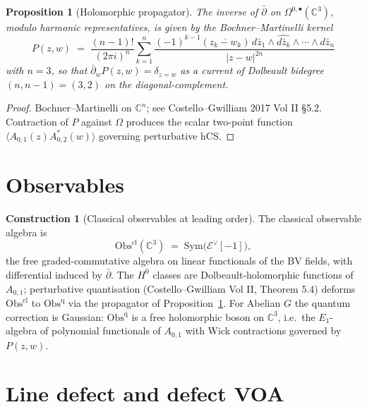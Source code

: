\documentclass[11pt]{amsart}
\providecommand{\C}{\mathbb{C}}
\providecommand{\dbar}{\bar{\partial}}
\providecommand{\Obs}{\mathrm{Obs}}
\providecommand{\Sym}{\mathrm{Sym}}
\theoremstyle{plain}
\newtheorem{proposition}[theorem]{Proposition}
\theoremstyle{definition}
\newtheorem{construction}[theorem]{Construction}
\theoremstyle{remark}
\begin{document}
\begin{proposition}[Holomorphic propagator]
\label{prop:propagator}
The inverse of $\dbar$ on $\Omega^{0,\bullet}(\C^3)$, modulo harmonic
representatives, is given by the Bochner--Martinelli kernel
\[
P(z, w) \;=\; \frac{(n-1)!}{(2\pi i)^{n}}
\sum_{k=1}^{n}
\frac{(-1)^{k-1} (\overline{z_k - w_k})\,
d\bar{z}_1 \wedge \widehat{d\bar{z}_k} \wedge \cdots \wedge d\bar{z}_n}
{|z - w|^{2n}}
\]
with $n = 3$, so that $\dbar_w P(z, w) = \delta_{z=w}$ as a current of
Dolbeault bidegree $(n, n-1) = (3, 2)$ on the diagonal-complement.
\end{proposition}

\begin{proof}
Bochner--Martinelli on $\C^n$; see Costello--Gwilliam 2017 Vol II §5.2.
Contraction of $P$ against $\Omega$ produces the scalar two-point function
$\langle A_{0,1}(z) A^{\ast}_{0,2}(w) \rangle$ governing perturbative
hCS.
\end{proof}

\section{Observables}

\begin{construction}[Classical observables at leading order]
\label{cons:obs-classical}
The classical observable algebra is
\[
\Obs^{\mathrm{cl}}(\C^3) \;=\; \Sym\bigl( \mathcal{E}^{\vee}[-1] \bigr),
\]
the free graded-commutative algebra on linear functionals of the
BV fields, with differential induced by $\dbar$. The $H^0$ classes are
Dolbeault-holomorphic functions of $A_{0,1}$; perturbative quantisation
(Costello--Gwilliam Vol II, Theorem 5.4) deforms $\Obs^{\mathrm{cl}}$ to
$\Obs^{\mathrm{q}}$ via the propagator of
Proposition~\ref{prop:propagator}. For Abelian $G$ the quantum
correction is Gaussian: $\Obs^{\mathrm{q}}$ is a free holomorphic boson
on $\C^3$, i.e.\ the $E_1$-algebra of polynomial functionals of
$A_{0,1}$ with Wick contractions governed by $P(z,w)$.
\end{construction}

\section{Line defect and defect VOA}
\end{document}
